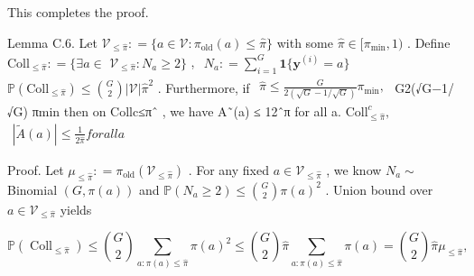 \documentclass[
  10
]{article}
\begin{document}
This completes the proof.

Lemma C.6. Let
\(\mathcal { V } _ { \le \hat { \pi } } : = \{ a \in \mathcal { V } : \pi _ { \mathrm { o l d } } ( a ) \le \hat { \pi } \}\)
with some
\(\hat { \pi } \in [ \pi _ { \operatorname* { m i n } } , 1 )\) . Define
\(\mathrm { C o l l } _ { \le \hat { \pi } } : = \{ \exists a \in\)
\(\mathcal { V } _ { \leq \hat { \pi } } : N _ { a } \geq 2 \}\) ,
\(\begin{array} { r } { N _ { a } : = \sum _ { i = 1 } ^ { G } \mathbf { 1 } \{ \mathbf { y } ^ { ( i ) } = a \} } \end{array}\)
\(\mathbb { P } ( \mathrm { C o l l } _ { \leq \hat { \pi } } ) \le \binom { G } { 2 } | \mathcal { V } | \hat { \pi } ^ { 2 }\)
. Furthermore, if
\(\begin{array} { r } { \hat { \pi } \leq \frac { G } { 2 ( \sqrt { G } - 1 / \sqrt { G } ) } \pi _ { \mathrm { m i n } } , } \end{array}\)
G2(√G−1/√G) πmin then on Collc≤πˆ , we have \textbar A˜(a)\textbar{} ≤
12ˆπ for all a.
\(\mathrm { C o l l } _ { \leq \hat { \pi } } ^ { c } ,\)
\(\begin{array} { r } { | \tilde { A } ( a ) | \le \frac { 1 } { 2 \hat { \pi } } f o r a l l a } \end{array}\)

Proof. Let
\(\mu _ { \le \hat { \pi } } : = \pi _ { \mathrm { o l d } } ( \mathcal { V } _ { \le \hat { \pi } } )\)
. For any fixed \(a \in \mathcal { V } _ { \leq \hat { \pi } }\) , we
know \(N _ { a } \sim\) Binomial \(( G , \pi ( a ) )\) and
\(\mathbb { P } ( N _ { a } \geq 2 ) \leq { \binom { G } { 2 } } \pi ( a ) ^ { 2 }\)
. Union bound over \(a \in \mathcal { V } _ { \leq \hat { \pi } }\)
yields

\[
\mathbb {P} (\operatorname{Coll} _ {\leq \hat {\pi}}) \leq \binom {G} {2} \sum_ {a: \pi (a) \leq \hat {\pi}} \pi (a) ^ {2} \leq \binom {G} {2} \hat {\pi} \sum_ {a: \pi (a) \leq \hat {\pi}} \pi (a) = \binom {G} {2} \hat {\pi} \mu_ {\leq \hat {\pi}},
\]
\end{document}
